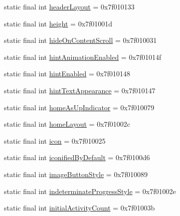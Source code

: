 \begin{CompactItemize}
static final int \hyperlink{classandroid_1_1support_1_1graphics_1_1drawable_1_1animated_1_1_r_1_1attr_9e4319a4c66f2b04fdc6ac7823192420}{headerLayout} = 0x7f010133
\item 
static final int \hyperlink{classandroid_1_1support_1_1graphics_1_1drawable_1_1animated_1_1_r_1_1attr_df6903c4d762a245c2736223b3b68c98}{height} = 0x7f01001d
\item 
static final int \hyperlink{classandroid_1_1support_1_1graphics_1_1drawable_1_1animated_1_1_r_1_1attr_61e3cc3c46d845cbb6a1df1cd6328d66}{hideOnContentScroll} = 0x7f010031
\item 
static final int \hyperlink{classandroid_1_1support_1_1graphics_1_1drawable_1_1animated_1_1_r_1_1attr_6a4ae12d18de8664725183599c5a4d97}{hintAnimationEnabled} = 0x7f01014f
\item 
static final int \hyperlink{classandroid_1_1support_1_1graphics_1_1drawable_1_1animated_1_1_r_1_1attr_13f66148e01bc9f8ce621bad230da38a}{hintEnabled} = 0x7f010148
\item 
static final int \hyperlink{classandroid_1_1support_1_1graphics_1_1drawable_1_1animated_1_1_r_1_1attr_18a23959afa0b3c3defb839a64797a70}{hintTextAppearance} = 0x7f010147
\item 
static final int \hyperlink{classandroid_1_1support_1_1graphics_1_1drawable_1_1animated_1_1_r_1_1attr_80e2b907645d9377e4cb1f3841a692f4}{homeAsUpIndicator} = 0x7f010079
\item 
static final int \hyperlink{classandroid_1_1support_1_1graphics_1_1drawable_1_1animated_1_1_r_1_1attr_24d842d62fe1f2c7880c3a2b08458c6c}{homeLayout} = 0x7f01002c
\item 
static final int \hyperlink{classandroid_1_1support_1_1graphics_1_1drawable_1_1animated_1_1_r_1_1attr_f96e087f86650a431d5cfac76d2edc39}{icon} = 0x7f010025
\item 
static final int \hyperlink{classandroid_1_1support_1_1graphics_1_1drawable_1_1animated_1_1_r_1_1attr_51b6834301725008d76f7d3c75efd8cd}{iconifiedByDefault} = 0x7f0100d6
\item 
static final int \hyperlink{classandroid_1_1support_1_1graphics_1_1drawable_1_1animated_1_1_r_1_1attr_73976054b2c7467f210a8d254091ff9c}{imageButtonStyle} = 0x7f010089
\item 
static final int \hyperlink{classandroid_1_1support_1_1graphics_1_1drawable_1_1animated_1_1_r_1_1attr_1d46676f0a008eaa65d55e51055982f6}{indeterminateProgressStyle} = 0x7f01002e
\item 
static final int \hyperlink{classandroid_1_1support_1_1graphics_1_1drawable_1_1animated_1_1_r_1_1attr_456318c741fb6c3e3e057f9dcda5a911}{initialActivityCount} = 0x7f01003b

\end{CompactItemize}
